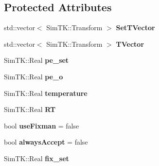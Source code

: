 \subsection*{Protected Attributes}
\begin{DoxyCompactItemize}
\item 
std\+::vector$<$ Sim\+T\+K\+::\+Transform $>$ {\bfseries Set\+T\+Vector}\hypertarget{classConformationalSearch_ab57c3b196616d1c49daf7fc95c87368e}{}\label{classConformationalSearch_ab57c3b196616d1c49daf7fc95c87368e}

\item 
std\+::vector$<$ Sim\+T\+K\+::\+Transform $>$ {\bfseries T\+Vector}\hypertarget{classConformationalSearch_aa65667a9158bf2dbbc5ed86167b9da21}{}\label{classConformationalSearch_aa65667a9158bf2dbbc5ed86167b9da21}

\item 
Sim\+T\+K\+::\+Real {\bfseries pe\+\_\+set}\hypertarget{classConformationalSearch_a124556d6acdd92a7f47b6655c696358f}{}\label{classConformationalSearch_a124556d6acdd92a7f47b6655c696358f}

\item 
Sim\+T\+K\+::\+Real {\bfseries pe\+\_\+o}\hypertarget{classConformationalSearch_a4225545cc7f1246b0ef8fab3a8221a37}{}\label{classConformationalSearch_a4225545cc7f1246b0ef8fab3a8221a37}

\item 
Sim\+T\+K\+::\+Real {\bfseries temperature}\hypertarget{classConformationalSearch_a88f50b05630ba9f65567fa2b1e709108}{}\label{classConformationalSearch_a88f50b05630ba9f65567fa2b1e709108}

\item 
Sim\+T\+K\+::\+Real {\bfseries RT}\hypertarget{classConformationalSearch_ae44e6a0fb042897741b587ac2b400046}{}\label{classConformationalSearch_ae44e6a0fb042897741b587ac2b400046}

\item 
bool {\bfseries use\+Fixman} = false\hypertarget{classConformationalSearch_ae9286f4596daf45d023670c0b6d0da2d}{}\label{classConformationalSearch_ae9286f4596daf45d023670c0b6d0da2d}

\item 
bool {\bfseries always\+Accept} = false\hypertarget{classConformationalSearch_a095f59dd63f97355f707b8a06b7ffb2b}{}\label{classConformationalSearch_a095f59dd63f97355f707b8a06b7ffb2b}

\item 
Sim\+T\+K\+::\+Real {\bfseries fix\+\_\+set}\hypertarget{classConformationalSearch_a07418527706294a33e21a71f6b21eee1}{}\label{classConformationalSearch_a07418527706294a33e21a71f6b21eee1}


\end{DoxyCompactItemize}
